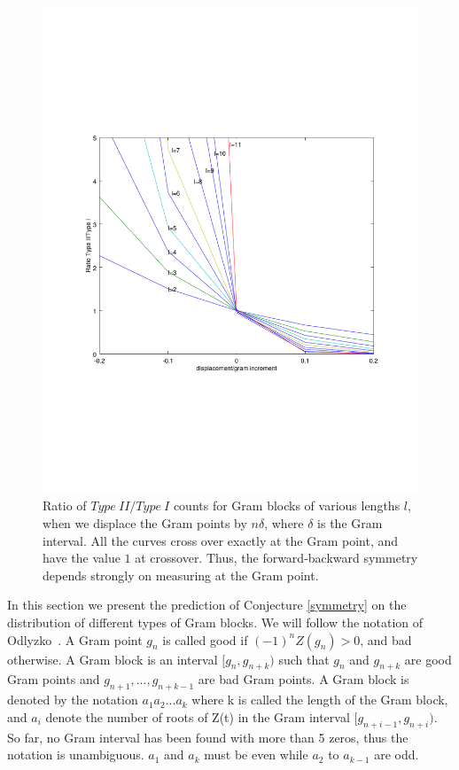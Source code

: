 \documentclass[twoside]{article}
\begin{document}
\begin{figure}
\centering
\includegraphics[width=1.1\textwidth]{typeIIratio}
\caption[]{ 
  Ratio of $Type~II/Type~I$ counts for Gram blocks of various lengths $l$, when we displace the Gram points by $n\delta$, where $\delta$ is the Gram interval. All the curves cross over exactly at the Gram point, and have the value $1$ at crossover. Thus, the forward-backward symmetry depends strongly on measuring at the Gram point.
 }
\vspace{1mm}
\label{typeIIratio}
\end{figure}

In this section we present the prediction of  Conjecture \ref{symmetry} on the distribution of different types of Gram blocks. We will follow the notation of   Odlyzko~\cite{Odlyzko(1992)}. A Gram point $g_n$ is called good if $(-1)^nZ(g_n) > 0$, and bad otherwise. A Gram block is an interval $[g_n, g_{n+k})$ such that $g_n$  and $g_{n+k}$ are good Gram points 
and $g_{n+1}, . . ., g_{n+k-1}$ are bad Gram points. A Gram block is denoted by the notation $a_1a_2 . . . a_k$ where k is called the length of the Gram block, and $a_i$ denote the number of roots of Z(t) in the Gram interval $[g_{n+i-1}, g_{n+i})$. So far, no Gram interval has been found with more than 5 zeros, thus the notation is unambiguous. $a_1$ and $a_k$ must be even while  $a_2$ to $a_{k-1}$ are odd.
\end{document}
